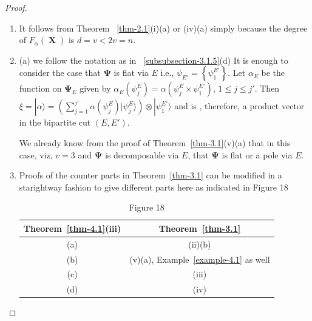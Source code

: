 \documentclass[a4paper,12pt]{article}
\DeclareMathOperator{\x}{\mathrm{X}}
\theoremstyle{definition}
\theoremstyle{underlinethm}
\theoremstyle{definition}
\begin{document}
\begin{proof}
\begin{enumerate}[label=(\roman*)]
\item It follows from Theorem ~\ref{thm-2.1}(i)(a) or (iv)(a) simply because the degree of $F_{\alpha}(\boldsymbol{\x})$ is $d=v < 2v = n$.

\item (a) we follow the notation as in ~\eqref{subsubsection-3.1.5}(d) It is enough to consider the case that $\boldsymbol{\Psi}$ is flat via $E$ i.e., $\psi_{E'}= \left\{\psi^{E'}_{1}\right\}$. Let $\alpha_{E}$ be the function on $\boldsymbol{\Psi}_{E}$ given by $\alpha_{E}\left(\psi_{j}^{E}\right) = \alpha\left(\psi_{j}^{E} \times \psi_{1}^{E'}\right)$, $1 \leq j \leq j'$. Then $\xi = | \alpha \rangle = \left(\sum\limits_{j=1}^{j'} \alpha(\psi_{j}^{E}) | \psi_{j}^{E} \rangle \right) \otimes | \psi_{1}^{E'} \rangle$ and is , therefore, a product vector in the bipartite cut $(E, E')$.

We already know from the proof of Theorem~\ref{thm-3.1}(v)(a) that in this case, viz, $v=3$ and $\boldsymbol{\Psi}$ is decomposable via $E$, that $\boldsymbol{\Psi}$ is flat or a pole via $E$.

\item Proofs of the counter parts in Theorem~\ref{thm-3.1} can be modified in a starightway fashion to give different parts here as indicated in Figure 18

\begin{table}
\begin{center}
\begin{tabular}{c|c}
Theorem~\ref{thm-4.1}(iii) & Theorem~\ref{thm-3.1}\\[4pt]
\hline
(a) & (ii)(b)\\[4pt]
\hline
(b) & (v)(a), Example~\ref{example-4.1} as well\\[4pt]
\hline
(c) & (iii)\\[4pt]
\hline
(d) & (iv)
\end{tabular}
\end{center}
\caption*{Figure 18}\label{fig018}
\end{table}



\end{enumerate}
\end{proof}
\end{document}
